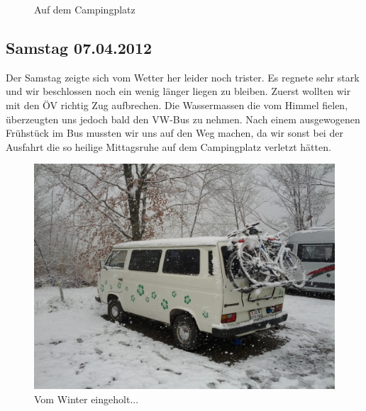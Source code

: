 \begin{figure}[H]
   \centering
   \quad
   \quad
   \quad
   \caption[Auf dem Campingplatz]{Auf dem Campingplatz}
\end{figure}

\subsection{Samstag 07.04.2012}
Der Samstag zeigte sich vom Wetter her leider noch trister.
Es regnete sehr stark und wir beschlossen noch ein wenig länger liegen zu bleiben.
Zuerst wollten wir mit den ÖV richtig Zug aufbrechen.
Die Wassermassen die vom Himmel fielen, überzeugten uns jedoch bald den VW-Bus zu nehmen.
Nach einem ausgewogenen Frühstück im Bus mussten wir uns auf den Weg machen, da wir sonst bei der Ausfahrt die so heilige Mittagsruhe auf dem Campingplatz verletzt hätten.

\begin{figure}[t]
    \centering
    \includegraphics[width=\textwidth]{../Bilder/Aegeri/11.jpg}
    \caption{Vom Winter eingeholt...}
    \label{img:Aegeri}
\end{figure}

